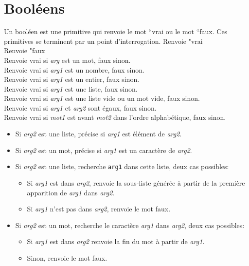 \section{Booléens}
Un booléen est une primitive qui renvoie le mot {}``vrai ou le mot
{}``faux. Ces primitives se terminent par un point d'interrogation.
 Renvoie "vrai\\
 Renvoie "faux\\
 Renvoie vrai si \textit{arg} est un mot, faux sinon.\\
 Renvoie vrai si \textit{arg1} est un nombre, faux sinon.\\
 Renvoie vrai si \textit{arg1} est un entier, faux sinon.\\
 Renvoie vrai si \textit{arg1} est une liste, faux sinon.\\
 Renvoie vrai si \textit{arg1} est une liste vide ou un mot vide, faux sinon.\\
 Renvoie vrai si \textit{arg1} et \textit{arg2} sont égaux, faux sinon.\\
 Renvoie vrai si \textit{mot1} est avant \textit{mot2} dans l'ordre alphabétique, faux sinon.\\
\begin{itemize}
 \item  Si \textit{arg2} est une liste, précise si \textit{arg1} est élément de \textit{arg2}. 
 \item Si \textit{arg2} est un mot, précise si \textit{arg1} est un caractère de \textit{arg2}.
\end{itemize}
\noindent
{}
\begin{itemize}
 \item  Si \textit{arg2} est une liste, recherche \texttt{arg1} dans cette liste, deux cas possibles:
	\begin{itemize}
 	\item  Si \textit{arg1} est dans \textit{arg2}, renvoie la sous-liste générée à partir de la première
apparition de \textit{arg1} dans \textit{arg2}.
	 \item Si \textit{arg1} n'est pas dans \textit{arg2}, renvoie le mot faux.
	\end{itemize}
\item  Si \textit{arg2} est un mot, recherche le caractère \textit{arg1} dans \textit{arg2}, deux cas possibles:
	\begin{itemize}
 	\item Si \textit{arg1} est dans \textit{arg2} renvoie la fin du mot à partir de \textit{arg1}.
	\item Sinon, renvoie le mot faux.
	\end{itemize}
\end{itemize}
